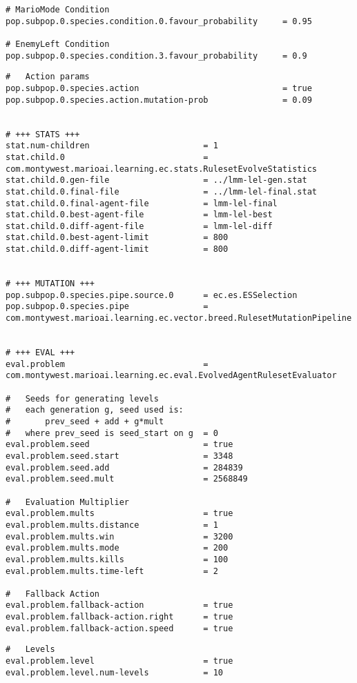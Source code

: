 \begin{appendices}
\begin{minipage}{0.9\linewidth}
\begin{lstlisting}
# MarioMode Condition
pop.subpop.0.species.condition.0.favour_probability 	= 0.95

# EnemyLeft Condition
pop.subpop.0.species.condition.3.favour_probability 	= 0.9
\end{lstlisting}
\end{minipage}

\begin{minipage}{0.9\linewidth}
\begin{lstlisting}
#	Action params
pop.subpop.0.species.action								= true
pop.subpop.0.species.action.mutation-prob 				= 0.09


# +++ STATS +++
stat.num-children 						= 1
stat.child.0 							= com.montywest.marioai.learning.ec.stats.RulesetEvolveStatistics
stat.child.0.gen-file					= ../lmm-lel-gen.stat
stat.child.0.final-file 				= ../lmm-lel-final.stat
stat.child.0.final-agent-file			= lmm-lel-final
stat.child.0.best-agent-file			= lmm-lel-best
stat.child.0.diff-agent-file			= lmm-lel-diff
stat.child.0.best-agent-limit			= 800
stat.child.0.diff-agent-limit			= 800


# +++ MUTATION +++
pop.subpop.0.species.pipe.source.0 		= ec.es.ESSelection
pop.subpop.0.species.pipe 				= com.montywest.marioai.learning.ec.vector.breed.RulesetMutationPipeline


# +++ EVAL +++
eval.problem							= com.montywest.marioai.learning.ec.eval.EvolvedAgentRulesetEvaluator

#	Seeds for generating levels
#	each generation g, seed used is:
#		prev_seed + add + g*mult
#   where prev_seed is seed_start on g  = 0
eval.problem.seed						= true
eval.problem.seed.start					= 3348
eval.problem.seed.add					= 284839
eval.problem.seed.mult					= 2568849

#	Evaluation Multiplier
eval.problem.mults						= true
eval.problem.mults.distance				= 1
eval.problem.mults.win					= 3200
eval.problem.mults.mode					= 200
eval.problem.mults.kills				= 100
eval.problem.mults.time-left			= 2

#	Fallback Action
eval.problem.fallback-action			= true
eval.problem.fallback-action.right		= true
eval.problem.fallback-action.speed		= true
\end{lstlisting}
\end{minipage}

\begin{minipage}{0.9\linewidth}
\begin{lstlisting}
#	Levels
eval.problem.level						= true
eval.problem.level.num-levels			= 10


\end{lstlisting}
\end{minipage}
\end{appendices}
